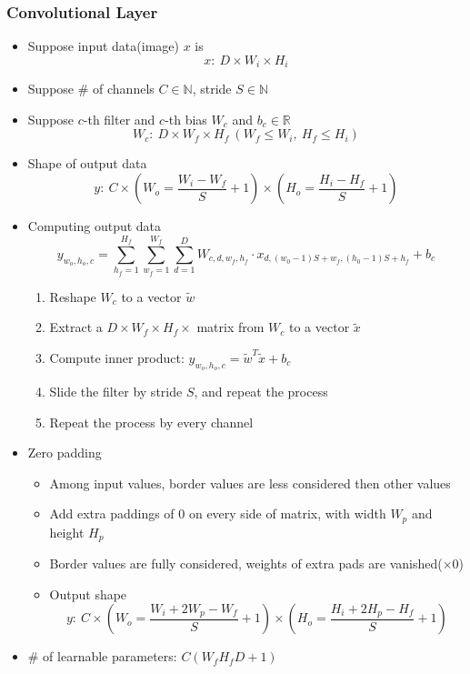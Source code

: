 \subsubsection*{Convolutional Layer}
\begin{itemize}
    \item Suppose input data(image) $x$ is
    \begin{equation}
        x:~D\times W_i\times H_i
    \end{equation}
    \item Suppose \# of channels $C\in\mathbb{N}$, stride $S\in\mathbb{N}$
    \item Suppose $c$-th filter and $c$-th bias $W_c$ and $b_c\in\mathbb{R}$
    \begin{equation}
        W_c:~D\times W_f\times H_f~(W_f\leq W_i,~H_f\leq H_i)
    \end{equation}
    \item Shape of output data
    \begin{equation}
        y:~C\times\left(W_o=\frac{W_i-W_f}{S}+1\right)\times\left(H_o=\frac{H_i-H_f}{S}+1\right)
    \end{equation}
    \item Computing output data
    \begin{equation}
        y_{w_o,h_o,c}=\sum_{h_f=1}^{H_f}\sum_{w_f=1}^{W_f}\sum_{d=1}^DW_{c,d,w_f,h_f}\cdot x_{d,(w_0-1)S+w_f,(h_0-1)S+h_f}+b_c
    \end{equation}
    \begin{enumerate}
        \item Reshape $W_c$ to a vector $\tilde{w}$
        \item Extract a $D\times W_f\times H_f\times$ matrix from $W_c$ to a vector $\tilde{x}$
        \item Compute inner product: $y_{w_o,h_o,c}=\tilde{w}^T\tilde{x}+b_c$
        \item Slide the filter by stride $S$, and repeat the process
        \item Repeat the process by every channel
    \end{enumerate}
    \item Zero padding
    \begin{itemize}
        \item Among input values, border values are less considered then other values
        \item Add extra paddings of 0 on every side of matrix, with width $W_p$ and height $H_p$
        \item Border values are fully considered, weights of extra pads are vanished($\times 0$)
        \item Output shape
        \begin{equation}
            y:~C\times\left(W_o=\frac{W_i+2W_p-W_f}{S}+1\right)\times\left(H_o=\frac{H_i+2H_p-H_f}{S}+1\right)
        \end{equation}
    \end{itemize}
    \item \# of learnable parameters: $C(W_fH_fD+1)$
\end{itemize}

